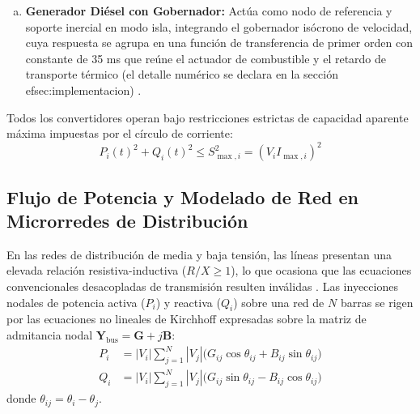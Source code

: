 \begin{enumerate}[a)]
    \item \textbf{Generador Diésel con Gobernador:} Actúa como nodo de referencia y soporte inercial en modo isla, integrando el gobernador isócrono de velocidad, cuya respuesta se agrupa en una función de transferencia de primer orden con constante de 35 ms que reúne el actuador de combustible y el retardo de transporte térmico (el detalle numérico se declara en la sección~
ef{sec:implementacion}) \citep{Saadat2010}.
\end{enumerate}

Todos los convertidores operan bajo restricciones estrictas de capacidad aparente máxima impuestas por el círculo de corriente:
\begin{equation}
P_i(t)^2 + Q_i(t)^2 \le S_{\max, i}^2 = \left(V_i I_{\max, i} \right)^2
\end{equation}

\subsection{Flujo de Potencia y Modelado de Red en Microrredes de Distribución}

En las redes de distribución de media y baja tensión, las líneas presentan una elevada relación resistiva-inductiva ($R/X \ge 1$), lo que ocasiona que las ecuaciones convencionales desacopladas de transmisión resulten inválidas \citep{Pompodakis2022Sensitivity}. Las inyecciones nodales de potencia activa ($P_i$) y reactiva ($Q_i$) sobre una red de $N$ barras se rigen por las ecuaciones no lineales de Kirchhoff expresadas sobre la matriz de admitancia nodal $\mathbf{Y}_{\text{bus}} = \mathbf{G} + j\mathbf{B}$:
\begin{align}
P_i &= |V_i| \sum_{j=1}^N |V_j| \big(G_{ij}\cos\theta_{ij} + B_{ij}\sin\theta_{ij} \big) \label{eq:p_flow_nl} \\
Q_i &= |V_i| \sum_{j=1}^N |V_j| \big(G_{ij}\sin\theta_{ij} - B_{ij}\cos\theta_{ij} \big) \label{eq:q_flow_nl}
\end{align}
donde $\theta_{ij} = \theta_i - \theta_j$.

